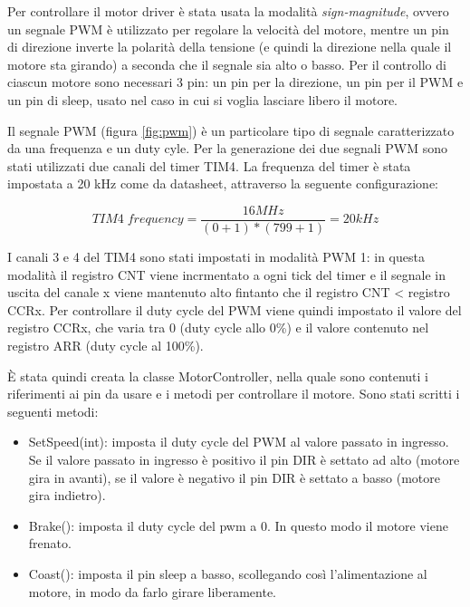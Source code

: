 Per controllare il motor driver è stata usata la modalità \textit{sign-magnitude}, ovvero un segnale PWM è utilizzato per regolare la velocità del motore, mentre un pin di direzione inverte la polarità della tensione (e quindi la direzione nella quale il motore sta girando) a seconda che il segnale sia alto o basso. Per il controllo di ciascun motore sono necessari 3 pin: un pin per la direzione, un pin per il PWM e un pin di sleep, usato nel caso in cui si voglia lasciare libero il motore.

Il segnale PWM (figura \ref{fig:pwm}) è un particolare tipo di segnale caratterizzato da una frequenza e un duty cyle. Per la generazione dei due segnali PWM sono stati utilizzati due canali del timer TIM4.
La frequenza del timer è stata impostata a 20 kHz come da datasheet, attraverso la seguente configurazione: 

\begin{displaymath}
TIM4 \; frequency = \frac{16 MHz}{(0 + 1)*(799 + 1)} = 20 kHz
\end{displaymath}

I canali 3 e 4 del TIM4 sono stati impostati in modalità PWM 1: in questa modalità il registro CNT viene incrmentato a ogni tick del timer e il segnale in uscita del canale x viene mantenuto alto fintanto che il registro CNT < registro CCRx. Per controllare il duty cycle del PWM viene quindi impostato il valore del registro CCRx, che varia tra 0 (duty cycle allo 0\%) e il valore contenuto nel registro ARR (duty cycle al 100\%).

È stata quindi creata la classe MotorController, nella quale sono contenuti i riferimenti ai pin da usare e i metodi per controllare il motore.
Sono stati scritti i seguenti metodi:
\begin{itemize}
    \item SetSpeed(int): imposta il duty cycle del PWM al valore passato in ingresso. Se il valore passato in ingresso è positivo il pin DIR è settato ad alto (motore gira in avanti), se il valore è negativo il pin DIR è settato a basso (motore gira indietro).
    \item Brake(): imposta il duty cycle del pwm a 0. In questo modo il motore viene frenato.
    \item Coast(): imposta il pin sleep a basso, scollegando così l'alimentazione al motore, in modo da farlo girare liberamente.
\end{itemize}

